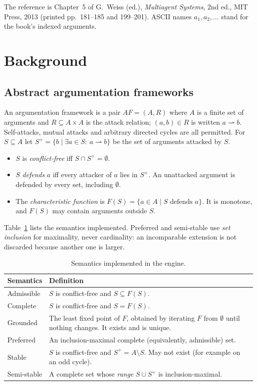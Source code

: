 \documentclass[11pt,a4paper]{article}
\newcommand{\AF}{\mathit{AF}}
\newcommand{\attacks}{\rightharpoonup}
\begin{document}
The reference is Chapter~5 of G.~Weiss (ed.), \emph{Multiagent Systems}, 2nd ed., MIT Press, 2013 (printed pp.~181--185 and 199--201). ASCII names $a_1,a_2,\dots$ stand for the book's indexed arguments.

\section{Background}
\subsection{Abstract argumentation frameworks}
An argumentation framework is a pair $\AF=(A,R)$ where $A$ is a finite set of arguments and $R\subseteq A\times A$ is the attack relation; $(a,b)\in R$ is written $a\attacks b$. Self-attacks, mutual attacks and arbitrary directed cycles are all permitted. For $S\subseteq A$ let $S^{+}=\{b\mid \exists a\in S:\ a\attacks b\}$ be the set of arguments attacked by $S$.

\begin{itemize}
  \item $S$ is \emph{conflict-free} iff $S\cap S^{+}=\emptyset$.
  \item $S$ \emph{defends} $a$ iff every attacker of $a$ lies in $S^{+}$. An unattacked argument is defended by every set, including $\emptyset$.
  \item The \emph{characteristic function} is $F(S)=\{a\in A\mid S\text{ defends }a\}$. It is monotone, and $F(S)$ may contain arguments outside $S$.
\end{itemize}

Table~\ref{tab:semantics} lists the semantics implemented. Preferred and semi-stable use \emph{set inclusion} for maximality, never cardinality: an incomparable extension is not discarded because another one is larger.

\begin{table}[H]
\centering
\caption{Semantics implemented in the engine.}
\label{tab:semantics}
\small
\begin{tabular}{@{}p{3cm}p{11.5cm}@{}}
\toprule
Semantics & Definition \\
\midrule
Admissible & $S$ is conflict-free and $S\subseteq F(S)$. \\
Complete & $S$ is conflict-free and $S=F(S)$. \\
Grounded & The least fixed point of $F$, obtained by iterating $F$ from $\emptyset$ until nothing changes. It exists and is unique. \\
Preferred & An inclusion-maximal complete (equivalently, admissible) set. \\
Stable & $S$ is conflict-free and $S^{+}=A\setminus S$. May not exist (for example on an odd cycle). \\
Semi-stable & A complete set whose \emph{range} $S\cup S^{+}$ is inclusion-maximal. \\
\bottomrule
\end{tabular}
\end{table}
\end{document}
